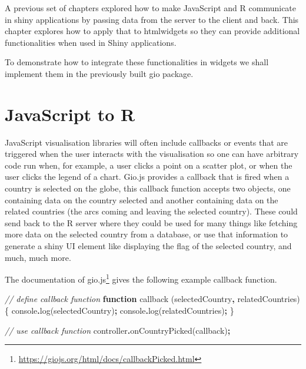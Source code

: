 \documentclass[
]{krantz}
\makeatletter
\newenvironment{Shaded}{\begin{snugshade}}{\end{snugshade}}
\newcommand{\BuiltInTok}[1]{#1}
\newcommand{\CommentTok}[1]{\textcolor[rgb]{0.37,0.37,0.37}{\textit{#1}}}
\newcommand{\FunctionTok}[1]{\textcolor[rgb]{0,0,0}{#1}}
\newcommand{\KeywordTok}[1]{\textcolor[rgb]{0.27,0.27,0.27}{\textbf{#1}}}
\newcommand{\NormalTok}[1]{#1}
\newcommand{\OperatorTok}[1]{\textcolor[rgb]{0.43,0.43,0.43}{\textbf{#1}}}
\renewcommand{\href}[2]{#2\footnote{\url{#1}}}
\newenvironment{kframe}{%
\medskip{}
\setlength{\fboxsep}{.8em}
 \def\at@end@of@kframe{}%
 \ifinner\ifhmode%
  \def\at@end@of@kframe{\end{minipage}}%
  \begin{minipage}{\columnwidth}%
 \fi\fi%
 \def\FrameCommand##1{\hskip\@totalleftmargin \hskip-\fboxsep
 \colorbox{shadecolor}{##1}\hskip-\fboxsep
     \hskip-\linewidth \hskip-\@totalleftmargin \hskip\columnwidth}%
 \MakeFramed {\advance\hsize-\width
   \@totalleftmargin\z@ \linewidth\hsize
   \@setminipage}}%
 {\par\unskip\endMakeFramed%
 \at@end@of@kframe}
\renewenvironment{Shaded}{\begin{kframe}}{\end{kframe}}
\makeatother
\begin{document}
A previous set of chapters explored how to make JavaScript and R communicate in shiny applications by passing data from the server to the client and back. This chapter explores how to apply that to htmlwidgets so they can provide additional functionalities when used in Shiny applications.

To demonstrate how to integrate these functionalities in widgets we shall implement them in the previously built gio package.

\hypertarget{javascript-to-r}{%
\section*{JavaScript to R}\label{javascript-to-r}}


JavaScript visualisation libraries will often include callbacks or events that are triggered when the user interacts with the visualisation so one can have arbitrary code run when, for example, a user clicks a point on a scatter plot, or when the user clicks the legend of a chart. Gio.js provides a callback that is fired when a country is selected on the globe, this callback function accepts two objects, one containing data on the country selected and another containing data on the related countries (the arcs coming and leaving the selected country). These could send back to the R server where they could be used for many things like fetching more data on the selected country from a database, or use that information to generate a shiny UI element like displaying the flag of the selected country, and much, much more.

The \href{https://giojs.org/html/docs/callbackPicked.html}{documentation of gio.js} gives the following example callback function.

\begin{Shaded}
\begin{Highlighting}[]
\CommentTok{// define callback function}
\KeywordTok{function} \FunctionTok{callback}\NormalTok{ (selectedCountry}\OperatorTok{,}\NormalTok{ relatedCountries) \{}
  \BuiltInTok{console}\OperatorTok{.}\FunctionTok{log}\NormalTok{(selectedCountry)}\OperatorTok{;}
  \BuiltInTok{console}\OperatorTok{.}\FunctionTok{log}\NormalTok{(relatedCountries)}\OperatorTok{;}
\NormalTok{\}}

\CommentTok{// use callback function}
\NormalTok{controller}\OperatorTok{.}\FunctionTok{onCountryPicked}\NormalTok{(callback)}\OperatorTok{;}
\end{Highlighting}
\end{Shaded}
\end{document}
